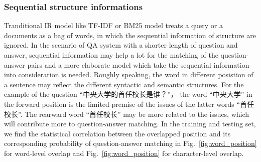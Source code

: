 \documentclass{llncs}
\begin{document}
\subsubsection{Sequential structure informations}

Tranditional IR model like TF-IDF or BM25 model treats a query or a documents as a bag of words, in which the sequential information of structure are ignored. In the scenario of QA system with a shorter length of question and answer, sequential information may help a lot for the matching of the question-answer pairs and a more elaborate model which take the sequential information into consideration is needed. Roughly speaking, the word in different posistion of a sentence may reflect the different syntactic and semantic structures. For the example of the question ``中央大学的首任校长是谁？''， the word ``中央大学'' in the forward position is the limited premise of the issues of the latter words ``首任校长''.  The rearward word ``首任校长'' may be more related to the issues, which will contribute more to question-answer matching. In the training and testing set, we find the statistical correlation between the overlapped position and its corresponding probability of question-answer matching in Fig.~\ref{fig:word_position} for word-level overlap and Fig.~\ref{fig:word_position} for character-level overlap. 
\end{document}
